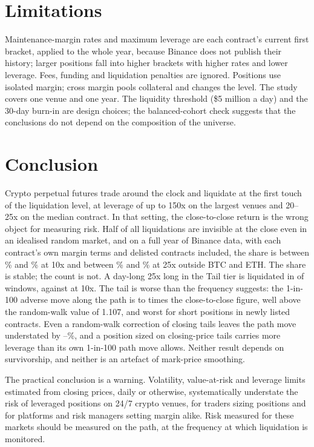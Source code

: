 \section{Limitations}

Maintenance-margin rates and maximum leverage are each contract's current first bracket, applied to
the whole year, because Binance does not publish their history; larger positions fall into higher
brackets with higher rates and lower leverage. Fees, funding and liquidation penalties are ignored.
Positions use isolated margin; cross margin pools collateral and changes the level. The study covers
one venue and one year. The liquidity threshold (\$5 million a day) and the 30-day burn-in are design
choices; the balanced-cohort check suggests that the conclusions do not depend on the composition of
the universe.

\section{Conclusion}
\label{sec:conclusion}

Crypto perpetual futures trade around the clock and liquidate at the first touch of the liquidation
level, at leverage of up to 150x on the largest venues and 20--25x on the median contract. In that
setting, the close-to-close return is the wrong object for measuring risk. Half of all liquidations
are invisible at the close even in an idealised random market, and on a full year of Binance data,
with each contract's own margin terms and delisted contracts included, the share is between
\UTenLo\% and \UTenHi\% at 10x and between \UTwentyFiveLo\% and \UTwentyFiveHi\% at 25x outside BTC
and ETH. The share is stable; the count is not. A day-long 25x long in the Tail tier is liquidated in
\TailDayLongPPTwentyFive{} of windows, against \TailDayLongPP{} at 10x. The tail is worse than the frequency suggests: the 1-in-100 adverse move along the path is
\KappaLo{} to \KappaHi{} times the close-to-close figure, well above the random-walk value of 1.107,
and worst for short positions in newly listed contracts. Even a random-walk correction of closing
tails leaves the path move understated by \RWExLo--\RWExHi\%, and a position sized on closing-price
tails carries more leverage than its own 1-in-100 path move allows. Neither result depends on
survivorship, and
neither is an artefact of mark-price smoothing.

The practical conclusion is a warning. Volatility, value-at-risk and leverage limits estimated from
closing prices, daily or otherwise, systematically understate the risk of leveraged positions on 24/7
crypto venues, for traders sizing positions and for platforms and risk managers setting margin
alike. Risk measured for these markets should be measured on the path, at the frequency at which
liquidation is monitored.

